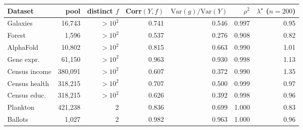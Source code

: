 \begin{tabular}{lrrrrrr}
\toprule
Dataset & pool & distinct $f$ & Corr$(Y,f)$ & $\mathrm{Var}(g)/\mathrm{Var}(Y)$ & $\rho^2$ & $\lambda^\star$ ($n{=}200$) \\
\midrule
Galaxies & 16,743 & $>10^2$ & 0.741 & 0.546 & 0.997 & 0.95 \\
Forest & 1,596 & $>10^2$ & 0.537 & 0.276 & 0.908 & 0.82 \\
AlphaFold & 10,802 & $>10^2$ & 0.815 & 0.663 & 0.990 & 1.01 \\
Gene expr. & 61,150 & $>10^2$ & 0.963 & 0.930 & 0.998 & 1.13 \\
Census income & 380,091 & $>10^2$ & 0.607 & 0.372 & 0.990 & 1.35 \\
Census health & 318,215 & $>10^2$ & 0.707 & 0.500 & 0.999 & 0.97 \\
Census educ. & 318,215 & $>10^2$ & 0.626 & 0.392 & 0.998 & 0.96 \\
Plankton & 421,238 & 2 & 0.836 & 0.699 & 1.000 & 0.83 \\
Ballots & 1,027 & 2 & 0.982 & 0.963 & 1.000 & 0.96 \\
\bottomrule
\end{tabular}